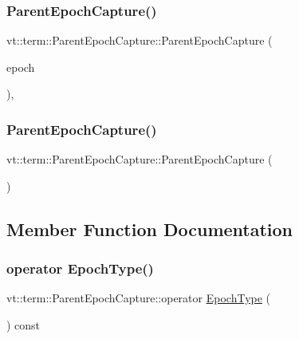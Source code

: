 \subsubsection{\texorpdfstring{Parent\+Epoch\+Capture()}{ParentEpochCapture()}\hspace{0.1cm}{\footnotesize\ttfamily [1/2]}}
{\footnotesize\ttfamily vt\+::term\+::\+Parent\+Epoch\+Capture\+::\+Parent\+Epoch\+Capture (\begin{DoxyParamCaption}\item[{\hyperlink{namespacevt_a985a5adf291c34a3ca263b3378388236}{Epoch\+Type}}]{epoch }\end{DoxyParamCaption})\hspace{0.3cm}{\ttfamily [inline]}, {\ttfamily [explicit]}}

\mbox{\label{structvt_1_1term_1_1_parent_epoch_capture_a8a84ae05c8fb68499c6d5e52f2420221}} 
\subsubsection{\texorpdfstring{Parent\+Epoch\+Capture()}{ParentEpochCapture()}\hspace{0.1cm}{\footnotesize\ttfamily [2/2]}}
{\footnotesize\ttfamily vt\+::term\+::\+Parent\+Epoch\+Capture\+::\+Parent\+Epoch\+Capture (\begin{DoxyParamCaption}{ }\end{DoxyParamCaption})}



\subsection{Member Function Documentation}
\mbox{\label{structvt_1_1term_1_1_parent_epoch_capture_a2d719573a4e469b37374b94b5c990d0a}} 
\subsubsection{\texorpdfstring{operator Epoch\+Type()}{operator EpochType()}}
{\footnotesize\ttfamily vt\+::term\+::\+Parent\+Epoch\+Capture\+::operator \hyperlink{namespacevt_a985a5adf291c34a3ca263b3378388236}{Epoch\+Type} (\begin{DoxyParamCaption}{ }\end{DoxyParamCaption}) const\hspace{0.3cm}{\ttfamily [inline]}}

